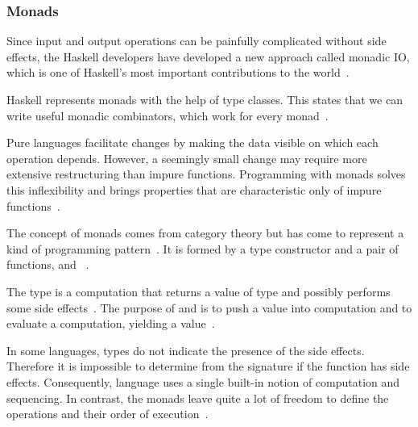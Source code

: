 \begin{frame}\frametitle{Monads}

Since input and output operations can be painfully complicated without side effects, the Haskell developers have developed a new approach called monadic IO, which is one of Haskell's most important contributions to the world~\cite{history-of-haskell}.

Haskell represents monads with the help of type classes. This states that we can write useful monadic combinators, which work for every monad~\cite{history-of-haskell}. 

Pure languages facilitate changes by making the data visible on which each operation depends. However, a seemingly small change may require more extensive restructuring than impure functions.  Programming with monads solves this inflexibility and brings properties that are characteristic only of impure functions~\cite{essence-of-fp}.

The concept of monads comes from category theory but has come to represent a kind of programming pattern~\cite{essence-of-fp,history-of-haskell}. It  is formed by a type constructor  and a pair of functions, and \expr{>>=}~\cite{history-of-haskell,essence-of-fp}.

The type  is a computation that returns a value of type  and possibly performs some side effects~\cite{history-of-haskell}. The purpose of  and \expr{>>=} is to push a value into computation and to evaluate a computation, yielding a value~\cite{essence-of-fp}.

In some languages, types do not indicate the presence of the side effects. Therefore it is impossible to determine from the signature if the function has side effects. Consequently, language uses a single built-in notion of computation and sequencing. In contrast, the monads leave quite a lot of freedom to define the operations and their order of execution~\cite{history-of-haskell}.

\end{frame}

